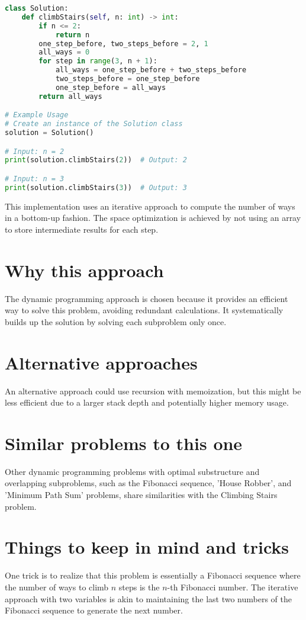 \begin{fullwidth}
\begin{lstlisting}[language=Python]
class Solution:
    def climbStairs(self, n: int) -> int:
        if n <= 2:
            return n
        one_step_before, two_steps_before = 2, 1
        all_ways = 0
        for step in range(3, n + 1):
            all_ways = one_step_before + two_steps_before
            two_steps_before = one_step_before
            one_step_before = all_ways
        return all_ways

# Example Usage
# Create an instance of the Solution class
solution = Solution()

# Input: n = 2
print(solution.climbStairs(2))  # Output: 2

# Input: n = 3
print(solution.climbStairs(3))  # Output: 3
\end{lstlisting}

\end{fullwidth}

This implementation uses an iterative approach to compute the number of ways in a bottom-up fashion. The space optimization is achieved by not using an array to store intermediate results for each step.

\section*{Why this approach}
The dynamic programming approach is chosen because it provides an efficient way to solve this problem, avoiding redundant calculations. It systematically builds up the solution by solving each subproblem only once.

\section*{Alternative approaches}
An alternative approach could use recursion with memoization, but this might be less efficient due to a larger stack depth and potentially higher memory usage.

\section*{Similar problems to this one}
Other dynamic programming problems with optimal substructure and overlapping subproblems, such as the Fibonacci sequence, 'House Robber', and 'Minimum Path Sum' problems, share similarities with the Climbing Stairs problem.

\section*{Things to keep in mind and tricks}
One trick is to realize that this problem is essentially a Fibonacci sequence where the number of ways to climb \(n\) steps is the \(n\)-th Fibonacci number. The iterative approach with two variables is akin to maintaining the last two numbers of the Fibonacci sequence to generate the next number.


